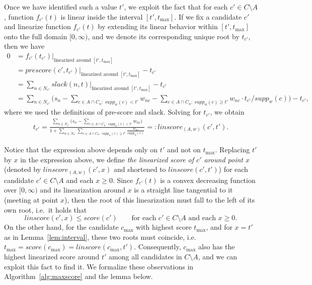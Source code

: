 Once we have identified such a value $t'$, we exploit the fact that for each $c'\in C\setminus A$, function $f_{c'}(t)$ is linear inside the interval $[t',t_{\max}]$. If we fix a candidate $c'$ and linearize function $f_{c'}(t)$ by extending its linear behavior within $[t', t_{\max}]$ onto the full domain $[0,\infty)$, and we denote its corresponding unique root by $t_{c'}$, then we have 
%
\begin{align*}
    0&= f_{c'}(t_{c'})|_{\text{linearized around } [t', t_{\max}]}\\
    &=prescore(c', t_{c'})|_{\text{linearized around } [t', t_{\max}]} - t_{c'}\\
    &=\sum_{n\in N_{c'}} slack(n,t)|_{\text{linearized around } [t', t_{\max}]} - t_{c'}\\
    &=\sum_{n\in N_{c'}} \Big( s_n - \sum_{c\in A\cap C_n: \ supp_{w}(c)< t'}w_{nc} - \sum_{c\in A\cap C_n: \ supp_w(c)\geq t'} w_{nc}\cdot t_{c'}/supp_w(c) \Big) - t_{c'},
\end{align*}
%
where we used the definitions of pre-score and slack. Solving for $t_{c'}$, we obtain
%
\begin{align*}
    t_{c'}=\frac{\sum_{n\in N_{c'}} \Big( s_n - \sum_{c\in A\cap C_n: \ supp_w(c)< t'} w_{nc} \Big)}%
    {1+\sum_{n\in N_{c'}} \sum_{c\in A\cap C_n: \ supp_w(c)\geq t'} \frac{w_{nc}}{supp_w(c)}}=:linscore_{(A,w)}(c',t').
\end{align*}

Notice that the expression above depends only on $t'$ and not on $t_{\max}$. 
Replacing $t'$ by $x$ in the expression above, we define \emph{the linearized score of $c'$ around point $x$} (denoted by $linscore_{(A,w)}(c',x)$ and shortened to $linscore(c',t')$) for each candidate $c'\in C\setminus A$ and each $x\geq 0$. 
Since $f_{c'}(t)$ is a convex decreasing function over $[0,\infty)$ and its linearization around $x$ is a straight line tangential to it (meeting at point $x$), then the root of this linearization must fall to the left of its own root, i.e.~it holds that 
$$linscore(c',x)\leq score(c') \quad \quad \text{for each } c'\in C\setminus A \text{ and each } x\geq 0.$$
On the other hand, for the candidate $c_{\max}$ with highest score $t_{\max}$, and for $x=t'$ as in Lemma~\ref{lem:interval}, these two roots must coincide, i.e. $t_{\max}=score(c_{\max})=linscore(c_{\max}, t')$. 
Consequently, $c_{\max}$ also has the highest linearized score around $t'$ among all candidates in $C\setminus A$, and we can exploit this fact to find it. We formalize these observations in Algorithm~\ref{alg:maxscore} and the lemma below.

